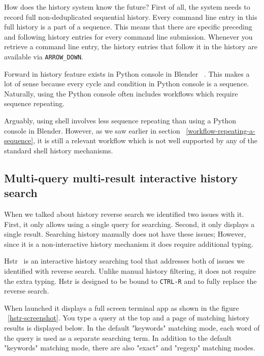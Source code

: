 \documentclass[thesis=M,english]{FITthesis}[2012/10/20]
\let\myCite\cite
\renewcommand\cite{\unskip~\myCite}
\let\myRef\ref
\renewcommand\ref{\unskip~\myRef}
\begin{document}
How does the history system know the future? First of all, the system needs to record full non-deduplicated sequential history. Every command line entry in this full history is a part of a sequence. This means that there are specific preceding and following history entries for every command line submission. Whenever you retrieve a command line entry, the history entries that follow it in the history are available via \verb|ARROW_DOWN|.


Forward in history feature exists in Python console in Blender \cite{tools-blender-docs-python-console}. This makes a lot of sense because every cycle and condition in Python console is a sequence. Naturally, using the Python console often includes  workflows which require sequence repeating.

Arguably, using shell involves less sequence repeating than using a Python console in Blender. However, as we saw earlier in section \ref{workflow-repeating-a-sequence}, it is still a relevant workflow which is not well supported by any of the standard shell history mechanisms.  




\subsection{Multi-query multi-result interactive history search}

When we talked about history reverse search we identified two issues with it. First, it only allows using a single query for searching. Second, it only displays a single result.
Searching history manually does not have these issues; However, since it is a non-interactive history mechanism it does require additional typing. 

Hstr\cite{toolshstr} is an interactive history searching tool that addresses both of issues we identified with reverse search. Unlike manual history filtering, it does not require the extra typing. Hstr is designed to be bound to \verb|CTRL-R| and to fully replace the reverse search.

When launched it displays a full screen terminal app as shown in the figure \ref{hstr-screenshot}. You type a query at the top and a page of matching history results is displayed below. In the default "keywords" matching mode, each word of the query is used as a separate searching term. 
In addition to the default "keywords" matching mode, there are also "exact" and "regexp" matching modes. 
\end{document}
